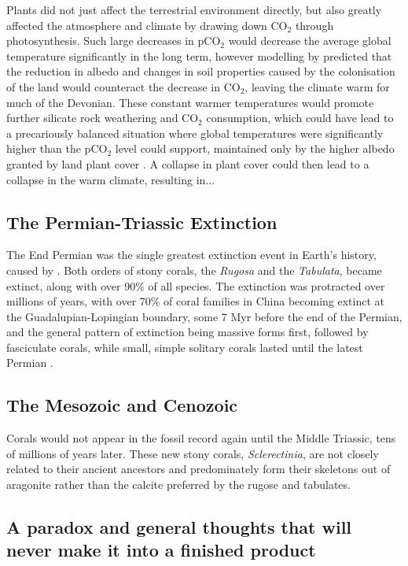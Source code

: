 \documentclass[11pt,a4paper]{article}
\begin{document}
Plants did not just affect the terrestrial environment directly, but also greatly affected the atmosphere and climate by drawing down CO$_{2}$ through photosynthesis. Such large decreases in pCO$_{2}$ would decrease the average global temperature significantly in the long term, however modelling by \cite{LeHir2011} predicted that the reduction in albedo and changes in soil properties caused by the colonisation of the land would counteract the decrease in CO$_{2}$, leaving the climate warm for much of the Devonian. These constant warmer temperatures would promote further silicate rock weathering and CO$_{2}$ consumption, which could have lead to a precariously balanced situation where global temperatures were significantly higher than the pCO$_{2}$ level could support, maintained only by the higher albedo granted by land plant cover \citep{LeHir2011}. A collapse in plant cover could then lead to a collapse in the warm climate, resulting in...

\subsection{The Permian-Triassic Extinction}

The End Permian was the single greatest extinction event in Earth's history, caused by . Both orders of stony corals, the \textit{Rugosa} and the \textit{Tabulata}, became extinct, along with over 90\% of all species. The extinction was protracted over millions of years, with over 70\% of coral families in China becoming extinct at the Guadalupian-Lopingian boundary, some 7 Myr before the end of the Permian, and the general pattern of extinction being massive forms first, followed by fasciculate corals, while small, simple solitary corals lasted until the latest Permian \citep{Wang2007}. 

\subsection{The Mesozoic and Cenozoic}

Corals would not appear in the fossil record again until the Middle Triassic, tens of millions of years later. These new stony corals, \textit{Sclerectinia}, are not closely related to their ancient ancestors and predominately form their skeletons out of aragonite rather than the calcite preferred by the rugose and tabulates. 

\subsection{A paradox and general thoughts that will never make it into a finished product}
\end{document}
